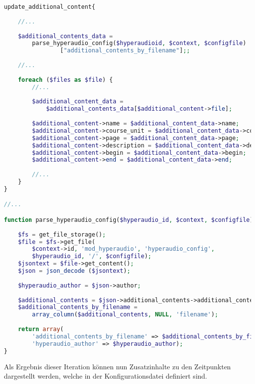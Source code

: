 \begin{lstlisting}[language=php,
             linewidth=\textwidth,
             caption={Ausschnitt der \textbf{locallib.php} in der 3. Iteration},
             label={lst:it3:locallib}]
update_additional_content{
	
	//...
	
    $additional_contents_data = 
        parse_hyperaudio_config($hyperaudioid, $context, $configfile)
                ["additional_contents_by_filename"];;
    
    //...
	
    foreach ($files as $file) {        
        //...
        
        $additional_content_data =
            $additional_contents_data[$additional_content->file];
        
        $additional_content->name = $additional_content_data->name;
        $additional_content->course_unit = $additional_content_data->course_unit;
        $additional_content->page = $additional_content_data->page;
        $additional_content->description = $additional_content_data->description;
        $additional_content->begin = $additional_content_data->begin;
        $additional_content->end = $additional_content_data->end;
        
        //...
    }    
}

//...

function parse_hyperaudio_config($hyperaudio_id, $context, $configfile) {
    
    $fs = get_file_storage();
    $file = $fs->get_file(
        $context->id, 'mod_hyperaudio', 'hyperaudio_config',
        $hyperaudio_id, '/', $configfile);
    $jsontext = $file->get_content();
    $json = json_decode ($jsontext);
    
    $hyperaudio_author = $json->author;
    
    $additional_contents = $json->additional_contents->additional_content;
    $additional_contents_by_filename =
        array_column($additional_contents, NULL, 'filename');
    
    return array(
        'additional_contents_by_filename' => $additional_contents_by_filename,
        'hyperaudio_author' => $hyperaudio_author);
}
\end{lstlisting}



Als Ergebnis dieser Iteration können nun Zusatzinhalte zu den Zeitpunkten dargestellt werden, welche in der Konfigurationsdatei definiert sind.

